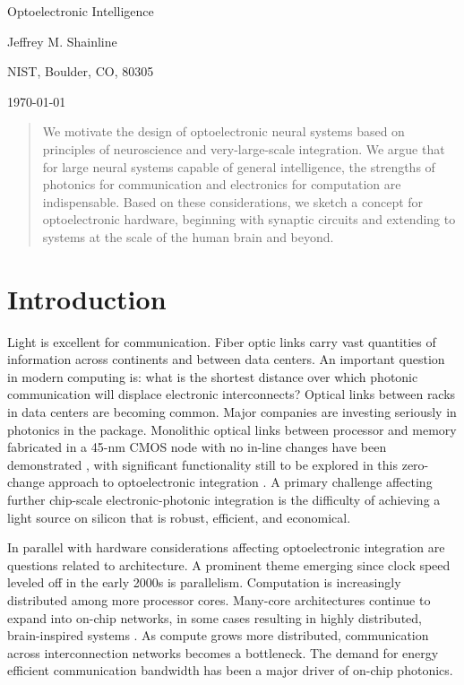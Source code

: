 \documentclass[twocolumn]{article}
\begin{document}
	
	\centerline{\LARGE Optoelectronic Intelligence}%
	\vspace{0.75em}
	\centerline{\Large Jeffrey M. Shainline}
	\vspace{0.5em}
	\centerline{\large NIST, Boulder, CO, 80305}
	\vspace{0.5em}
	\centerline{\large \today}
	
\begin{abstract}
We motivate the design of optoelectronic neural systems based on principles of neuroscience and very-large-scale integration. We argue that for large neural systems capable of general intelligence, the strengths of photonics for communication and electronics for computation are indispensable. Based on these considerations, we sketch a concept for optoelectronic hardware, beginning with synaptic circuits and extending to systems at the scale of the human brain and beyond.
\end{abstract}

\section{\label{sec:introduction}Introduction}
Light is excellent for communication. Fiber optic links carry vast quantities of information across continents and between data centers. An important question in modern computing is: what is the shortest distance over which photonic communication will displace electronic interconnects? Optical links between racks in data centers are becoming common. Major companies are investing seriously in photonics in the package. Monolithic optical links between processor and memory fabricated in a 45-nm CMOS node with no in-line changes have been demonstrated \cite{suwa2015}, with significant functionality still to be explored in this zero-change approach to optoelectronic integration \cite{stra2018}. A primary challenge affecting further chip-scale electronic-photonic integration is the difficulty of achieving a light source on silicon that is robust, efficient, and economical.

In parallel with hardware considerations affecting optoelectronic integration are questions related to architecture. A prominent theme emerging since clock speed leveled off in the early 2000s is parallelism. Computation is increasingly distributed among more processor cores. Many-core architectures continue to expand into on-chip networks, in some cases resulting in highly distributed, brain-inspired systems \cite{bo2000,pfgr2013,mear2014,fuga2014,payu2017,dasr2018}. As compute grows more distributed, communication across interconnection networks becomes a bottleneck. The demand for energy efficient communication bandwidth has been a major driver of on-chip photonics.
\end{document}
